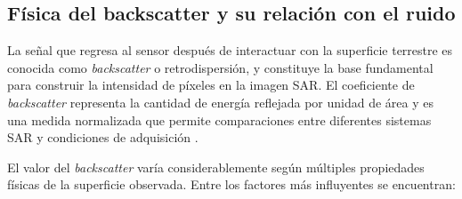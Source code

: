 \subsection{Física del backscatter y su relación con el ruido}

La señal que regresa al sensor después de interactuar con la superficie terrestre es conocida como \emph{backscatter} o retrodispersión, y constituye la base fundamental para construir la intensidad de píxeles en la imagen SAR. El coeficiente de \emph{backscatter} representa la cantidad de energía reflejada por unidad de área y es una medida normalizada que permite comparaciones entre diferentes sistemas SAR y condiciones de adquisición \cite{ulaby2014microwave}.

El valor del \emph{backscatter} varía considerablemente según múltiples propiedades físicas de la superficie observada. Entre los factores más influyentes se encuentran:

